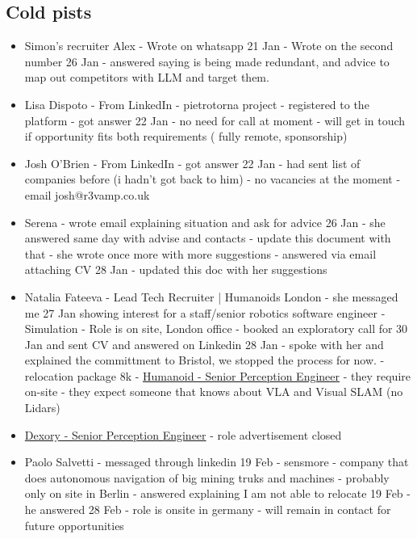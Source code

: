 \subsection*{Cold pists}
\begin{itemize}
\item
    Simon's recruiter Alex - Wrote on whatsapp 21 Jan - Wrote on the second
    number 26 Jan - answered saying is being made redundant, and advice to map
    out competitors with LLM and target them.
\item 
    Lisa Dispoto - From LinkedIn - pietrotorna project - registered to the
    platform - got answer 22 Jan - no need for call at moment - will get in
    touch if opportunity fits both requirements ( fully remote, sponsorship)
\item
    Josh O'Brien - From LinkedIn - got answer 22 Jan - had sent list of
    companies before (i hadn't got back to him) - no vacancies at the moment
    - email josh@r3vamp.co.uk
\item
    Serena - wrote email explaining situation and ask for advice 26 Jan - she
    answered same day with advise and contacts - update this document with that
    - she wrote once more with more suggestions - answered via email attaching
    CV 28 Jan - updated this doc with her suggestions

\item
    Natalia Fateeva - Lead Tech Recruiter | Humanoids London - she messaged me 27
    Jan showing interest for a staff/senior robotics software engineer -
    Simulation - Role is on site, London office - booked an exploratory call for
    30 Jan and sent CV and answered on Linkedin 28 Jan - spoke with her and
    explained the committment to Bristol, we stopped the process for now. -
    relocation package 8k -
    \href{https://www.linkedin.com/jobs/view/4318754896/?trk=eml-email_job_alert_digest_01-primary_job_list-0-jobcard_body_4088072385&refId=iTGQmFTPanRx9DOXNbMu9g%3D%3D&trackingId=l%2BnIdG3n6lNXsy3agOnjsw%3D%3D}
    {Humanoid - Senior Perception Engineer} - they require on-site
    - they expect someone that knows about VLA and Visual SLAM (no Lidars)

\item
    \href{https://job-boards.eu.greenhouse.io/dexory/jobs/4562804101}{Dexory -
    Senior Perception Engineer} - role advertisement closed

\item Paolo Salvetti - messaged through linkedin 19 Feb - sensmore - company
  that does autonomous navigation of big mining truks and machines - probably
    only on site in Berlin - answered explaining I am not able to relocate 19
    Feb - he answered 28 Feb - role is onsite in germany - will remain in
    contact for future opportunities

\end{itemize}




